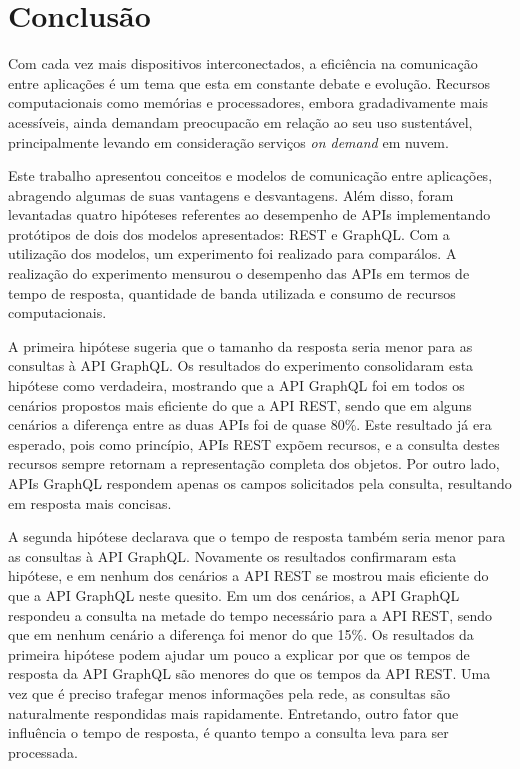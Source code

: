 \chapter{Conclusão}

Com cada vez mais dispositivos interconectados, a eficiência na comunicação entre aplicações é um tema que esta em constante debate e evolução. Recursos computacionais como memórias e processadores, embora gradadivamente mais acessíveis, ainda demandam preocupacão em relação ao seu uso sustentável, principalmente levando em consideração serviços \textit{on demand} em nuvem.

Este trabalho apresentou conceitos e modelos de comunicação entre aplicações, abragendo algumas de suas vantagens e desvantagens. Além disso, foram levantadas quatro hipóteses referentes ao desempenho de APIs implementando protótipos de dois dos modelos apresentados: REST e GraphQL. Com a utilização dos modelos, um experimento foi realizado para comparálos. A realização do experimento mensurou o desempenho das APIs em termos de tempo de resposta, quantidade de banda utilizada e consumo de recursos computacionais.

A primeira hipótese sugeria que o tamanho da resposta seria menor para as consultas à API GraphQL. Os resultados do experimento consolidaram esta hipótese como verdadeira, mostrando que a API GraphQL foi em todos os cenários propostos mais eficiente do que a API REST, sendo que em alguns cenários a diferença entre as duas APIs foi de quase 80\%. Este resultado já era esperado, pois como princípio, APIs REST expõem recursos, e a consulta destes recursos sempre retornam a representação completa dos objetos. Por outro lado, APIs GraphQL respondem apenas os campos solicitados pela consulta, resultando em resposta mais concisas.

A segunda hipótese declarava que o tempo de resposta também seria menor para as consultas à API GraphQL. Novamente os resultados confirmaram esta hipótese, e em nenhum dos cenários a API REST se mostrou mais eficiente do que a API GraphQL neste quesito. Em um dos cenários, a API GraphQL respondeu a consulta na metade do tempo necessário para a API REST, sendo que em nenhum cenário a diferença foi menor do que 15\%. Os resultados da primeira hipótese podem ajudar um pouco a explicar por que os tempos de resposta da API GraphQL são menores do que os tempos da API REST. Uma vez que é preciso trafegar menos informações pela rede, as consultas são naturalmente respondidas mais rapidamente. Entretando, outro fator que influência o tempo de resposta, é quanto tempo a consulta leva para ser processada.

